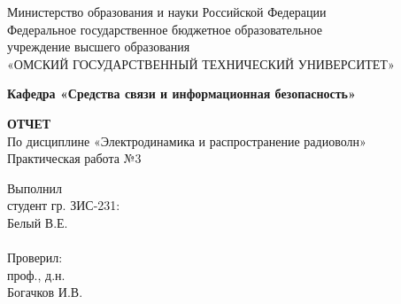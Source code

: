 \documentclass[fontsize=14pt,a4paper]{scrartcl}
\begin{document}
  \begin{titlepage}                                                         
    \newpage                                                                        
    \begin{center}   
      Министерство образования и науки Российской Федерации  \\ 
      \vspace{1em}                                                    
      {\mdseries
        Федеральное государственное бюджетное образовательное \\
        учреждение высшего образования \\
        «ОМСКИЙ ГОСУДАРСТВЕННЫЙ ТЕХНИЧЕСКИЙ УНИВЕРСИТЕТ»
      }                               
      \vspace{1em}      

      {\bfseries Кафедра «Средства связи и информационная безопасность»}  

      \vspace{\fill}                                                         
                                   
      {\bfseries ОТЧЕТ } \\                                 
      По дисциплине «Электродинамика и распространение радиоволн» \\ 
      \vspace{1em} 
      Практическая работа №3 \\                                                           
    \end{center}                                                          
                                                                                        
    \vspace{\fill}                                                         
                                                                                        
    \hfill\parbox{5cm}{
      Выполнил\\
      студент гр. ЗИС-231:\\
      Белый В.Е. \\
      \\
      Проверил:\\
      проф., д.н. \\
      Богачков И.В.\\
    }                                                                                                                              
                                                                                                                                                                              

\end{titlepage}
\end{document}
